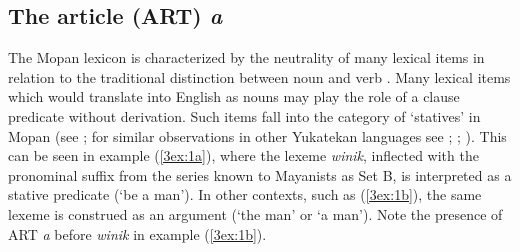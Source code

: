 \documentclass[output=paper]{langsci/langscibook}
\begin{document}
\subsection{The article (ART) {\emph{a}} }\label{3sec:21}
The Mopan lexicon is characterized by the neutrality of many lexical items in relation to the traditional distinction between noun and verb \citep{danziger:08}.  Many lexical items which would translate into English as nouns may play the role of a clause predicate without derivation. Such items fall into the category of `statives' in Mopan (see \citealt{danziger:96}; for similar observations in other Yukatekan languages see \citealt{bricker:81}; \citealt{lucy:94}; \citealt{lois:vapnarsky:06}).  This can be seen in example (\ref{3ex:1a}), where the lexeme {\emph{winik}}, inflected with the pronominal suffix from the series known to Mayanists as Set B, is interpreted as a stative predicate (`be a man').  In other contexts, such as (\ref{3ex:1b}), the same lexeme is construed as an argument (`the man' or `a man').  Note the presence of ART {\emph{a}} before {\emph{winik}} in example (\ref{3ex:1b}).
\end{document}
